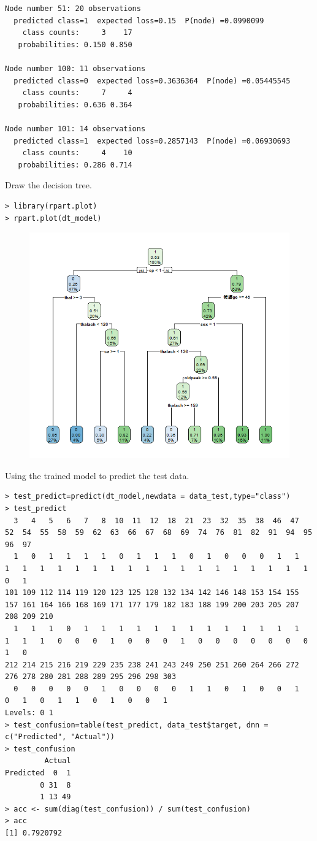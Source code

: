 \documentclass{article}
\begin{document}
\begin{lstlisting}
Node number 51: 20 observations
  predicted class=1  expected loss=0.15  P(node) =0.0990099
    class counts:     3    17
   probabilities: 0.150 0.850 

Node number 100: 11 observations
  predicted class=0  expected loss=0.3636364  P(node) =0.05445545
    class counts:     7     4
   probabilities: 0.636 0.364 

Node number 101: 14 observations
  predicted class=1  expected loss=0.2857143  P(node) =0.06930693
    class counts:     4    10
   probabilities: 0.286 0.714 
\end{lstlisting}
Draw the decision tree.
\begin{lstlisting}
> library(rpart.plot)
> rpart.plot(dt_model)
\end{lstlisting}
 \begin{figure}[H]
\centering
  \includegraphics[width=.8\textwidth]{1-2-1.png} %
\end{figure}
Using the trained model to predict the test data.
\begin{lstlisting}
> test_predict=predict(dt_model,newdata = data_test,type="class")
> test_predict
  3   4   5   6   7   8  10  11  12  18  21  23  32  35  38  46  47  52  54  55  58  59  62  63  66  67  68  69  74  76  81  82  91  94  95  96  97 
  1   0   1   1   1   1   0   1   1   1   0   1   0   0   0   1   1   1   1   1   1   1   1   1   1   1   1   1   1   1   1   1   1   1   1   0   1 
101 109 112 114 119 120 123 125 128 132 134 142 146 148 153 154 155 157 161 164 166 168 169 171 177 179 182 183 188 199 200 203 205 207 208 209 210 
  1   1   1   0   1   1   1   1   1   1   1   1   1   1   1   1   1   1   1   1   0   0   0   1   0   0   0   1   0   0   0   0   0   0   0   1   0 
212 214 215 216 219 229 235 238 241 243 249 250 251 260 264 266 272 276 278 280 281 288 289 295 296 298 303 
  0   0   0   0   0   1   0   0   0   0   1   1   0   1   0   0   1   0   1   0   1   1   0   1   0   0   1 
Levels: 0 1
> test_confusion=table(test_predict, data_test$target, dnn = c("Predicted", "Actual"))
> test_confusion
         Actual
Predicted  0  1
        0 31  8
        1 13 49
> acc <- sum(diag(test_confusion)) / sum(test_confusion)
> acc
[1] 0.7920792
\end{lstlisting}
\end{document}
